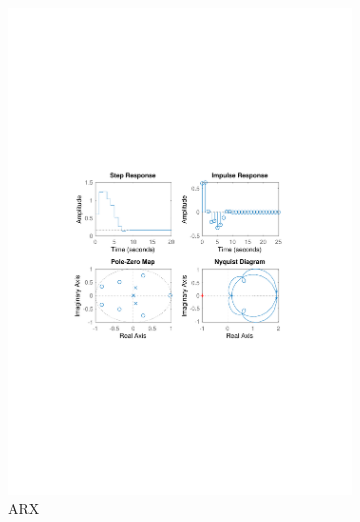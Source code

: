 \documentclass[]{article}
\begin{document}
\begin{figure}[ht]
\centering
\begin{subfigure}{.49\textwidth}
	\centering
	\includegraphics[trim= 10cm 8cm 10cm 8cm, scale=0.4]{figures/3-ARX-Ex1.pdf}
	\caption{ARX}
	\label{fig:Ex1-ARX}
\end{subfigure}
\begin{subfigure}{.49\textwidth}
	\centering

\end{subfigure}
\end{figure}
\end{document}
